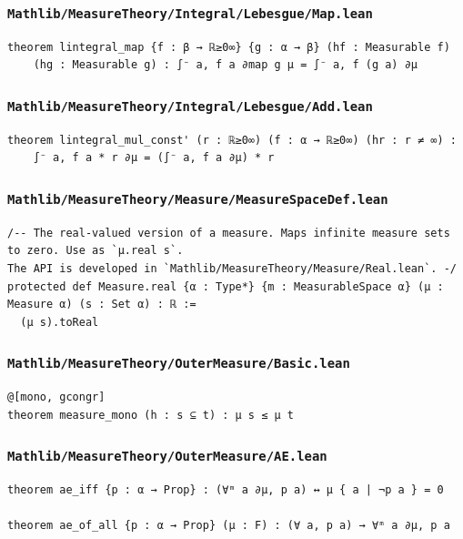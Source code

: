 \subsubsection{\texttt{Mathlib/MeasureTheory/Integral/Lebesgue/Map.lean}}
\begin{lstlisting}[language=lean]
theorem lintegral_map {f : β → ℝ≥0∞} {g : α → β} (hf : Measurable f)
    (hg : Measurable g) : ∫⁻ a, f a ∂map g μ = ∫⁻ a, f (g a) ∂μ
\end{lstlisting}

\subsubsection{\texttt{Mathlib/MeasureTheory/Integral/Lebesgue/Add.lean}}
\begin{lstlisting}[language=lean]
theorem lintegral_mul_const' (r : ℝ≥0∞) (f : α → ℝ≥0∞) (hr : r ≠ ∞) :
    ∫⁻ a, f a * r ∂μ = (∫⁻ a, f a ∂μ) * r
\end{lstlisting}

\subsubsection{\texttt{Mathlib/MeasureTheory/Measure/MeasureSpaceDef.lean}}
\begin{lstlisting}[language=lean]
/-- The real-valued version of a measure. Maps infinite measure sets to zero. Use as `μ.real s`.
The API is developed in `Mathlib/MeasureTheory/Measure/Real.lean`. -/
protected def Measure.real {α : Type*} {m : MeasurableSpace α} (μ : Measure α) (s : Set α) : ℝ :=
  (μ s).toReal
\end{lstlisting}

\subsubsection{\texttt{Mathlib/MeasureTheory/OuterMeasure/Basic.lean}}
\begin{lstlisting}[language=lean]
@[mono, gcongr]
theorem measure_mono (h : s ⊆ t) : μ s ≤ μ t
\end{lstlisting}

\subsubsection{\texttt{Mathlib/MeasureTheory/OuterMeasure/AE.lean}}
\begin{lstlisting}[language=lean]
theorem ae_iff {p : α → Prop} : (∀ᵐ a ∂μ, p a) ↔ μ { a | ¬p a } = 0

theorem ae_of_all {p : α → Prop} (μ : F) : (∀ a, p a) → ∀ᵐ a ∂μ, p a
\end{lstlisting}

